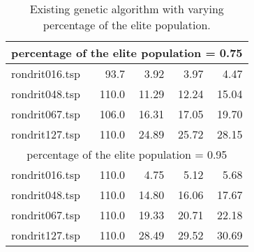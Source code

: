 \begin{table}[H]
{\begin{tabular}{l rrrr}
\midrule
\multicolumn{5}{c}{percentage of the elite population = 0.75}\\ 
\midrule
rondrit016.tsp & 93.7 & 3.92 & 3.97 & 4.47 \\
rondrit048.tsp & 110.0 & 11.29 & 12.24 & 15.04 \\
rondrit067.tsp & 106.0 & 16.31 & 17.05 & 19.70 \\
rondrit127.tsp & 110.0 & 24.89 & 25.72 & 28.15 \\
\midrule
\multicolumn{5}{c}{percentage of the elite population = 0.95}\\ 
\midrule
rondrit016.tsp & 110.0 & 4.75 & 5.12 & 5.68 \\
rondrit048.tsp & 110.0 & 14.80 & 16.06 & 17.67 \\
rondrit067.tsp & 110.0 & 19.33 & 20.71 & 22.18 \\
rondrit127.tsp & 110.0 & 28.49 & 29.52 & 30.69 \\
\bottomrule 
\end{tabular} 
}
\caption{Existing genetic algorithm with varying percentage of the elite population.}
\label{tab:vary_elitism}
\end{table}
